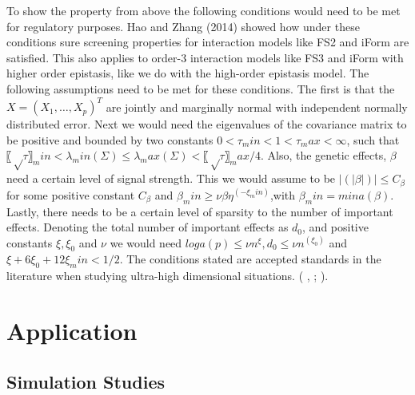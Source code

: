 \documentclass[11pt,]{book}
\theoremstyle{definition}
\theoremstyle{definition}
\theoremstyle{remark}
\begin{document}
To show the property from above the following conditions would need to
be met for regulatory purposes. Hao and Zhang (2014) showed how under
these conditions sure screening properties for interaction models like
FS2 and iForm are satisfied. This also applies to order-3 interaction
models like FS3 and iForm with higher order epistasis, like we do with
the high-order epistasis model. The following assumptions need to be met
for these conditions. The first is that the \(X=(X_1,…,X_p )^T\) are
jointly and marginally normal with independent normally distributed
error. Next we would need the eigenvalues of the covariance matrix to be
positive and bounded by two constants \(0<τ_min<1<τ_max<∞\), such that
\(〖√τ〗_min<λ_min (Σ)≤λ_max (Σ)<〖√τ〗_max/4\). Also, the genetic
effects, \(β\) need a certain level of signal strength. This we would
assume to be \(|(|β|)|≤C_β\) for some positive constant \(C_β\) and
\(β_min≥νβη^(-ξ_min )\),with \(β_min=mina(β)\). Lastly, there needs to
be a certain level of sparsity to the number of important effects.
Denoting the total number of important effects as \(d_0\), and positive
constants \(ξ,ξ_0\) and \(ν\) we would need
\(loga(p)≤νn^ξ,d_0≤νn^(ξ_0 )\) and \(ξ+6ξ_0+12ξ_min<1/2\). The
conditions stated are accepted standards in the literature when studying
ultra-high dimensional situations. (\cite{hao2014interaction} ,
\cite{fan2008sure}; \cite{sun2013genome}).

\section{Application}\label{application-1}

\subsection{Simulation Studies}\label{simulation-studies}
\end{document}
